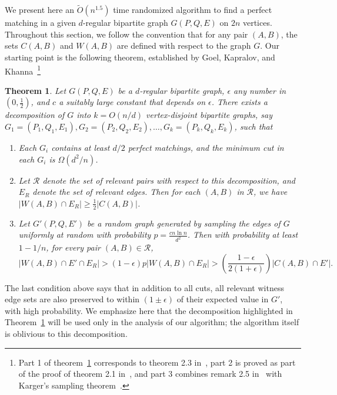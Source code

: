 \documentclass[11pt]{article}
\newtheorem{theorem}{Theorem}[section]
\newcommand{\coll}{{\mathcal R}}
\begin{document}
We present here an $\tilde{O}(n^{1.5})$ time randomized algorithm to find a
perfect matching in a given $d$-regular bipartite graph $G(P,Q,E)$ on $2n$
vertices.  Throughout this section, we follow the convention that for any pair
$(A,B)$, the sets $C(A,B)$ and $W(A,B)$ are defined with respect to the graph
$G$.  Our starting point is the following theorem, established by Goel,
Kapralov, and Khanna~\cite{gkk:rbp08}\footnote{Part 1 of
  theorem~\ref{thm:GKK09} corresponds to theorem 2.3 in~\cite{gkk:rbp08}, part
  2 is proved as part of the proof of theorem 2.1 in~\cite{gkk:rbp08}, and
  part 3 combines remark 2.5 in~\cite{gkk:rbp08} with Karger's sampling
  theorem~\cite{kar94a}.}

\begin{theorem}
\label{thm:GKK09}
Let $G(P,Q,E)$ be a $d$-regular bipartite graph, $\epsilon$ any number in
$(0,\frac{1}{2})$, and $c$ a suitably large constant that depends on
$\epsilon$. There {\em exists} a decomposition of $G$ into $k = O(n/d)$
vertex-disjoint bipartite graphs, say $G_1=(P_1,Q_1,E_1), G_2=(P_2,Q_2,E_2),
\ldots, G_k=(P_k,Q_k,E_k)$, such that

\begin{enumerate}
\item
Each $G_i$ contains at least $d/2$ perfect matchings, and the minimum cut in each $G_i$ is $\Omega(d^2/n)$.

\item Let $\coll$ denote the set of relevant pairs with respect to this
  decomposition, and $E_R$ denote the set of relevant edges.  Then for each
  $(A,B)$ in $\coll$, we have $|W(A,B) \cap E_R| \geq \frac{1}{2} |C(A,B)|$.

\item Let $G'(P,Q,E')$ be a random graph generated by sampling the edges of
  $G$ {\em uniformly} at random with probability $p = \frac{c n \ln n}{d^2}$.
  Then with probability at least $1 - 1/n$, for every pair $(A,B) \in
  \coll$,
$$|W(A,B) \cap E' \cap E_R| > (1 - \epsilon)p |W(A,B) \cap E_R| > \left(
  \frac{1- \epsilon}{2(1+\epsilon)} \right) |C(A,B)\cap E'|.$$
\end{enumerate}
\end{theorem}


The last condition above says that in addition to all cuts, all relevant
witness edge sets are also preserved to within $(1 \pm \epsilon)$ of their
expected value in $G'$, with high probability. We emphasize here that the
decomposition highlighted in Theorem~\ref{thm:GKK09} will be used only in the
analysis of our algorithm; the algorithm itself is oblivious to this
decomposition.
\end{document}
